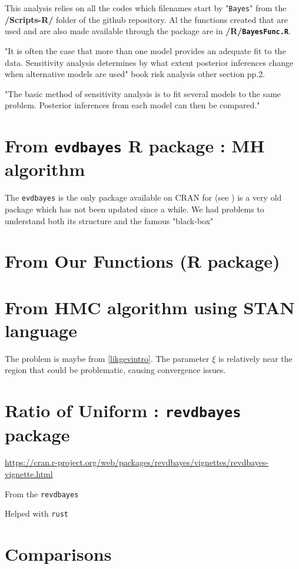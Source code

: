 
This analysis relies on all the codes which filenames start by "\texttt{Bayes}" from the \textbf{/Scripts-R/} folder of the github repository. Al the functions created that are used and are also made available through the package are in \textbf{/R/\texttt{BayesFunc.R}}.


"It is often the case that more than one model provides an adequate fit to the data. Sensitivity analysis determines by what extent posterior inferences change when alternative
models are used"   book risk analysis other section pp.2.

"The basic method of sensitivity analysis is to fit several models to
the same problem. Posterior inferences from each model can then be compared."


\section{From \texttt{evdbayes} R package : MH algorithm}

The \texttt{evdbayes} is the only package available on CRAN for (see \citet{ribatet_users_2006}) is a very old package which has not been updated since a while. We had problems to understand both its structure and the famous "black-box"


\section{From Our Functions (R package)}



\section{From HMC algorithm using STAN language}

The problem is maybe from \ref{likgevintro}. The parameter $\xi$ is relatively near the region that could be problematic, causing convergence issues. 



\section{Ratio of Uniform : \texttt{revdbayes} package}

\url{https://cran.r-project.org/web/packages/revdbayes/vignettes/revdbayes-vignette.html}


From the \texttt{revdbayes}

Helped with \texttt{rust}
\section{Comparisons}

